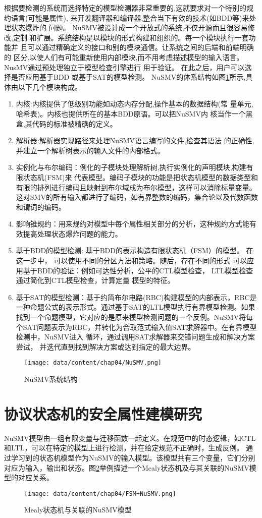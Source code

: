 根据要检测的系统而选择特定的模型检测器非常重要的,这就要求对一个特别的规约语言(可能是属性),
来开发翻译器和编译器,整合当下有效的技术(如BDD等)来处理状态爆炸的
问题。
NuSMV被设计成一个开放式的系统,不仅开源而且很容易修改,定制
和扩展。系统结构是以模块的形式构建和组织的。每一个模块执行一套功能并
且可以通过精确定义的接口和别的模块通信。让系统之间的后端和前端明确的
区分,以使人们有可能重新使用内部模块,而不用考虑描述模型的输入语言。NusMV通过预处理独立于模型检查引擎进行
用于验证。
 在此之后，用户可以选择是否应用基于BDD
或基于SAT的模型检测。
NuSMV的体系结构如图\ref{figure-NuSMV}所示,具体由以下几个模块构成。
\begin{enumerate}
\item 内核:内核提供了低级别功能如动态内存分配,操作基本的数据结构(常
量单元,哈希表)。内核也提供所在的基本BDD原语。可以把NuSMV内
核当作一个黑盒,其代码的标准被精确的定义。
\item 解析器:解析器实现路径来处理NuSMV语言编写的文件,检查其语法
的正确性,并建立一个解析树表示的输入文件的内部格式。
\item 实例化与布尔编码：例化的子模块处理解析树,执行实例化的声明模块,构建有限状态机(FSM)来
代表模型。编码子模块的功能是把状态机模型的数据类型和有限的排列进行编码且映射到布尔域成为布尔模型，这样可以消除标量变量。
这对SMV的所有输入都进行了编码，如有界整数的编码，集合论以及代数函数和谓词的编码。
\item 影响锥规约：用来规约对模型中每个属性相关部分的分析，这种规约方式能有效提高处理状态爆炸问题的能力。
\item 基于BDD的模型检测: 基于BDD的表示构造有限状态机（FSM）的模型。 在这一步中，
可以使用不同的分区方法和策略。随后，存在不同的形式
可以应用基于BDD的验证：例如可达性分析，公平的CTL模型检查，
LTL模型检查通过简化到CTL模型检查，计算定量
模型的特征。
\item 基于SAT的模型检测：基于约简布尔电路(RBC)构建模型的内部表示，RBC是一种命题公式的表示形式。通过基于SAT的LTL模型执行有界模型检测。如果找到一个命题模型，它对应的是原来模型检测问题的一个反例。NuSMV将每个SAT问题表示为RBC，并转化为合取范式输入值SAT求解器中。在有界模型检测中，NuSMV进入
循环，通过调用SAT求解器来交错问题生成和解决方案尝试，
并迭代直到找到解决方案或达到指定的最大边界。
\end{enumerate}
\begin{figure}[htp]
	\centering
	\texttt{[image: data/content/chap04/NuSMV.png]}
	\caption{NuSMV系统结构}
	\label{figure-NuSMV}
\end{figure}


\section{协议状态机的安全属性建模研究}
NuSMV模型由一组有限变量与迁移函数一起定义。在规范中的时态逻辑，如CTL和LTL，可以在特定的模型上进行检测，并在给定规范不正确时，生成反例。
通过学习到的状态机模型作为NuSMV的输入模型。该模型共有三个变量，它们分别对应为输入，输出和状态。图\ref{NuSMV+FSM}举例描述一个Mealy状态机及与其关联的NuSMV模型的对应关系。
\begin{figure}[htp]
	\centering
	\texttt{[image: data/content/chap04/FSM+NuSMV.png]}
	\caption{Mealy状态机与关联的NuSMV模型}
	\label{NuSMV+FSM}
\end{figure}


